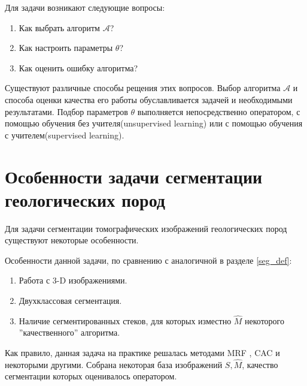 \documentclass[14pt, a4paper, oneside, bold]{extarticle}
\makeatletter
\newcommand{\problemtitle}[1]{\gdef\@problemtitle{#1}}%
\newcommand{\probleminput}[1]{\gdef\@probleminput{#1}}%
\newcommand{\problemquestion}[1]{\gdef\@problemquestion{#1}}%
\makeatother
\begin{document}
Для задачи возникают следующие вопросы:
\begin{enumerate}
	\item Как выбрать алгоритм $\mathcal{A}$?
	\item Как настроить параметры $\theta$?
	\item Как оценить ошибку алгоритма?
\end{enumerate}
Существуют различные способы рещения этих вопросов.
Выбор алгоритма $\mathcal{A}$ и способа оценки качества его работы обуславливается задачей и необходимыми результатами. 
Подбор параметров $\theta$ выполняется непосредственно 
оператором, с помощью 
обучения без учителя(unsupervised learning) или с помощью обучения с учителем(supervised learning).

\newpage


\section{Особенности задачи сегментации геологических пород} \label{seg_features}

Для задачи сегментации томографических изображений геологических пород существуют некоторые особенности. 

\begin{problem}
  \problemtitle{\textbf{Задача сегментации томографических изображений}}
  \probleminput{исходный стек изображений 
	$S = (s_{ijk})_{i=1, j=1, k=1}^{H, W, D},\ s_{ijk} \in [0, 1]$, где 
$H$ -- высота изображения, $W$ -- ширина изображения, $D$ -- количество изображений. }
  \problemquestion{для каждого пикселя соответствующую ему метку класса, 
т.е. соответствие $s_{ijk} \rightarrow m_{ijk},\ m_{ijk} \in C = \{ 0, 1 \} $, где класс $0$ откносится к порам, а класс $1$ -- твердому веществу.
}
\end{problem}

Особенности данной задачи, по сравнению с аналогичной в разделе \ref{seg_def}:
\begin{enumerate}
	\item Работа с 3-D изображениями.
	\item Двухклассовая сегментация.
	\item Наличие сегментированных стеков, для которых изместно 
	$\hat{M}$ некоторого ''качественного'' алгоритма.	
\end{enumerate}

Как правило, данная задача на практике решалась методами MRF \cite{14}, CAC \cite{12} и некоторыми другими. Собрана некоторая база изображений 
$S, \hat{M}$, качество сегментации которых оценивалось оператором.
\end{document}
